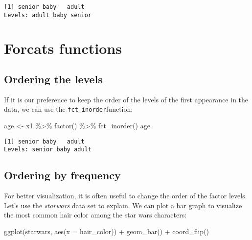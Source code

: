 \documentclass[
]{article}
\newenvironment{Shaded}{\begin{snugshade}}{\end{snugshade}}
\newcommand{\AttributeTok}[1]{\textcolor[rgb]{0.77,0.63,0.00}{#1}}
\newcommand{\FunctionTok}[1]{\textcolor[rgb]{0.00,0.00,0.00}{#1}}
\newcommand{\NormalTok}[1]{#1}
\newcommand{\OtherTok}[1]{\textcolor[rgb]{0.56,0.35,0.01}{#1}}
\newcommand{\SpecialCharTok}[1]{\textcolor[rgb]{0.00,0.00,0.00}{#1}}
\begin{document}
\begin{verbatim}
[1] senior baby   adult 
Levels: adult baby senior
\end{verbatim}

\hypertarget{forcats-functions}{%
\section{Forcats functions}\label{forcats-functions}}

\hypertarget{ordering-the-levels}{%
\subsection{Ordering the levels}\label{ordering-the-levels}}

If it is our preference to keep the order of the levels of the first
appearance in the data, we can use the \texttt{fct\_inorder}function:

\begin{Shaded}
\begin{Highlighting}[]
\NormalTok{age }\OtherTok{\textless{}{-}}\NormalTok{ x1 }\SpecialCharTok{\%\textgreater{}\%} \FunctionTok{factor}\NormalTok{() }\SpecialCharTok{\%\textgreater{}\%} \FunctionTok{fct\_inorder}\NormalTok{()}
\NormalTok{age}
\end{Highlighting}
\end{Shaded}

\begin{verbatim}
[1] senior baby   adult 
Levels: senior baby adult
\end{verbatim}

\hypertarget{ordering-by-frequency}{%
\subsection{Ordering by frequency}\label{ordering-by-frequency}}

For better visualization, it is often useful to change the order of the
factor levels. Let's use the \emph{starwars} data set to explain. We can
plot a bar graph to visualize the most common hair color among the star
wars characters:

\begin{Shaded}
\begin{Highlighting}[]
\FunctionTok{ggplot}\NormalTok{(starwars, }\FunctionTok{aes}\NormalTok{(}\AttributeTok{x =}\NormalTok{ hair\_color)) }\SpecialCharTok{+} 
    \FunctionTok{geom\_bar}\NormalTok{() }\SpecialCharTok{+} 
    \FunctionTok{coord\_flip}\NormalTok{()  }
\end{Highlighting}
\end{Shaded}
\end{document}
